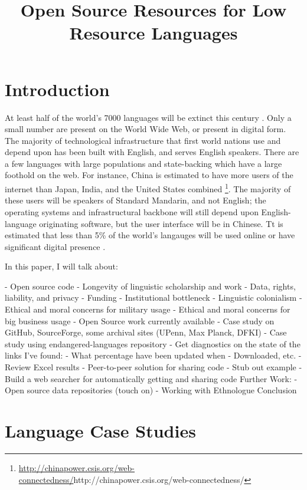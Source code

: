 \documentclass[10pt, a4paper]{article}
\title{Open Source Resources for Low Resource Languages}
\begin{document}
\begin{titlepage}
\maketitleabstract



\tableofcontents
\end{titlepage}


\setcounter{page}{1}
\section{Introduction}

At least half of the world's 7000 languages will be extinct this century \cite[p. 27]{grenoble_2011}. Only a small number are present on the World Wide Web, or present in digital form. The majority of technological infrastructure that first world nations use and depend upon has been built with English, and serves English speakers. There are a few languages with large populations and state-backing which have a large foothold on the web. For instance, China is estimated to have more users of the internet than Japan, India, and the United States combined \footnote{\url{http://chinapower.csis.org/web-connectedness/}{http://chinapower.csis.org/web-connectedness/}}. The majority of these users will be speakers of Standard Mandarin, and not English; the operating systems and infrastructural backbone will still depend upon English-language originating software, but the user interface will be in Chinese. Tt is estimated that less than 5\% of the world's langauges will be used online or have significant digital presence \cite{kornai2013digital}.

In this paper, I will talk about:

- Open source code
  -  Longevity of linguistic scholarship and work
  - Data, rights, liability, and privacy
  - Funding
    - Institutional bottleneck
    - Linguistic colonialism
    - Ethical and moral concerns for military usage
    - Ethical and moral concerns for big business usage
- Open Source work currently available
  - Case study on GitHub, SourceForge, some archival sites (UPenn, Max Planck, DFKI)
- Case study using endangered-languages repository
  - Get diagnostics on the state of the links I've found:
    - What percentage have been updated when
    - Downloaded, etc.
  - Review Excel results
- Peer-to-peer solution for sharing code
  - Stub out example
  - Build a web searcher for automatically getting and sharing code
Further Work:
  - Open source data repositories (touch on)
  - Working with Ethnologue
Conclusion


\section{Language Case Studies}
\end{document}

